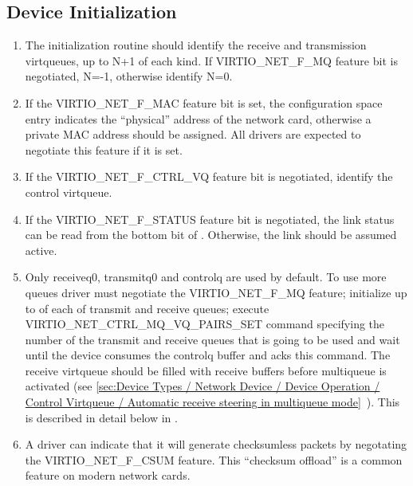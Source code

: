 \subsection{Device Initialization}\label{sec:Device Types / Network Device / Device Initialization}

\begin{enumerate}
\item The initialization routine should identify the receive and
  transmission virtqueues, up to N+1 of each kind. If
  VIRTIO_NET_F_MQ feature bit is negotiated,
  N=-1, otherwise identify N=0.

\item If the VIRTIO_NET_F_MAC feature bit is set, the configuration
  space  entry indicates the “physical” address of the
  network card, otherwise a private MAC address should be
  assigned. All drivers are expected to negotiate this feature if
  it is set.

\item If the VIRTIO_NET_F_CTRL_VQ feature bit is negotiated,
  identify the control virtqueue.

\item If the VIRTIO_NET_F_STATUS feature bit is negotiated, the link
  status can be read from the bottom bit of .
  Otherwise, the link should be assumed active.

\item Only receiveq0, transmitq0 and controlq are used by default.
  To use more queues driver must negotiate the VIRTIO_NET_F_MQ
  feature; initialize up to  of each of
  transmit and receive queues;
  execute VIRTIO_NET_CTRL_MQ_VQ_PAIRS_SET command specifying the
  number of the transmit and receive queues that is going to be
  used and wait until the device consumes the controlq buffer and
  acks this command.
  The receive virtqueue should be filled with receive buffers
  before multiqueue is activated
  (see \ref{sec:Device Types / Network Device / Device Operation / Control Virtqueue / Automatic receive steering in multiqueue mode}~).
  This is described in detail below in .

\item A driver can indicate that it will generate checksumless
  packets by negotating the VIRTIO_NET_F_CSUM feature. This 
  “checksum offload” is a common feature on modern network cards.


\end{enumerate}
